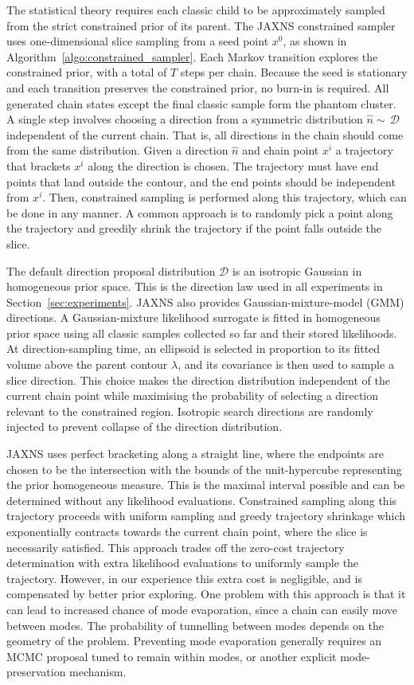 \documentclass[pdflatex,sn-basic,icol]{sn-jnl}
\theoremstyle{plain}
\theoremstyle{definition}
\begin{document}
The statistical theory requires each classic child to be approximately sampled from the strict constrained prior of its parent.
The JAXNS constrained sampler uses one-dimensional slice sampling \citep{2000physics...9028N} from a seed point $x^0$, as shown in Algorithm~\ref{algo:constrained_sampler}.
Each Markov transition explores the constrained prior, with a total of $T$ steps per chain.
Because the seed is stationary and each transition preserves the constrained prior, no burn-in is required.
All generated chain states except the final classic sample form the phantom cluster.
A single step involves choosing a direction from a symmetric distribution $\hat{n} \sim\, \mathcal{D}$ independent of the current chain.
That is, all directions in the chain should come from the same distribution.
Given a direction $\hat{n}$ and chain point $x^i$ a trajectory that brackets $x^i$ along the direction is chosen.
The trajectory must have end points that land outside the contour, and the end points should be independent from $x^i$.
Then, constrained sampling is performed along this trajectory, which can be done in any manner.
A common approach is to randomly pick a point along the trajectory and greedily shrink the trajectory if the point falls outside the slice.

The default direction proposal distribution $\mathcal{D}$ is an isotropic Gaussian in homogeneous prior space.
This is the direction law used in all experiments in Section~\ref{sec:experiments}.
JAXNS also provides Gaussian-mixture-model (GMM) directions.
A Gaussian-mixture likelihood surrogate is fitted in homogeneous prior space using all classic samples collected so far and their stored likelihoods.
At direction-sampling time, an ellipsoid is selected in proportion to its fitted volume above the parent contour $\lambda$, and its covariance is then used to sample a slice direction.
This choice makes the direction distribution independent of the current chain point while maximising the probability of selecting a direction relevant to the constrained region.
Isotropic search directions are randomly injected to prevent collapse of the direction distribution.

JAXNS uses perfect bracketing along a straight line, where the endpoints are chosen to be the intersection with the bounds of the unit-hypercube representing the prior homogeneous measure.
This is the maximal interval possible and can be determined without any likelihood evaluations.
Constrained sampling along this trajectory proceeds with uniform sampling and greedy trajectory shrinkage which exponentially contracts towards the current chain point, where the slice is necessarily satisfied.
This approach trades off the zero-cost trajectory determination with extra likelihood evaluations to uniformly sample the trajectory.
However, in our experience this extra cost is negligible, and is compensated by better prior exploring.
One problem with this approach is that it can lead to increased chance of mode evaporation, since a chain can easily move between modes.
The probability of tunnelling between modes depends on the geometry of the problem.
Preventing mode evaporation generally requires an MCMC proposal tuned to remain within modes, or another explicit mode-preservation mechanism.
\end{document}
